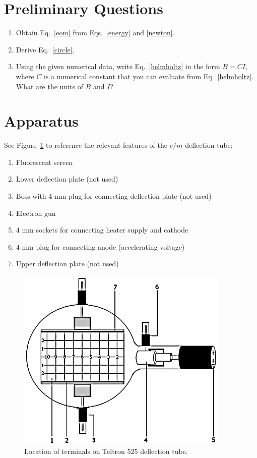 \section{Preliminary Questions}

\begin{enumerate}
\item Obtain Eq.~\ref{eom} from Eqs.~\ref{energy} and \ref{newton}.
\item Derive Eq.~\ref{circle}.
\item Using the given numerical data, write Eq.~\ref{helmholtz} in the form $B = CI$,
where $C$ is a numerical constant that you can evaluate from Eq.~\ref{helmholtz}.
What are the units of $B$ and $I$? 
\end{enumerate}

\section{Apparatus}

See Figure~\ref{tubepic} to reference the relevant features of the $e/m$ deflection tube:

\begin{enumerate}
\item Fluorescent screen
\item Lower deflection plate (not used)
\item Boss with 4 mm plug for connecting deflection plate (not used)
\item Electron gun
\item 4 mm sockets for connecting heater supply and cathode
\item 4 mm plug for connecting anode (accelerating voltage)
\item Upper deflection plate (not used)
\end{enumerate}

\begin{figure}
\begin{center}
\includegraphics[width=4in]{../images/teltron525.png} 
\caption{Location of terminals on Teltron 525 deflection tube.}
\label{tubepic}
\end{center}
\end{figure}



